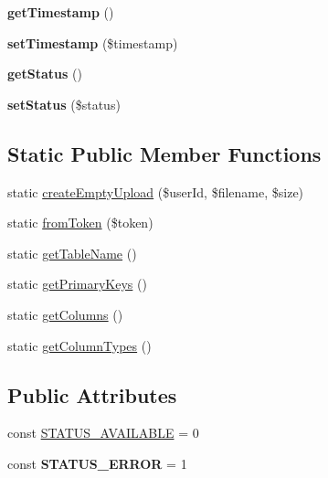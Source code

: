 \begin{DoxyCompactItemize}
\item 
\hypertarget{classUpload_af1374be09f4af36dd1030de3471364f2}{
{\bfseries getTimestamp} ()}
\label{classUpload_af1374be09f4af36dd1030de3471364f2}

\item 
\hypertarget{classUpload_aa428bb0780b59f6ffd0117cd476ba09c}{
{\bfseries setTimestamp} (\$timestamp)}
\label{classUpload_aa428bb0780b59f6ffd0117cd476ba09c}

\item 
\hypertarget{classUpload_aa43980fea79203e3dce98a81d6bb5869}{
{\bfseries getStatus} ()}
\label{classUpload_aa43980fea79203e3dce98a81d6bb5869}

\item 
\hypertarget{classUpload_aa54f646d417aec96d6ef7b7907812429}{
{\bfseries setStatus} (\$status)}
\label{classUpload_aa54f646d417aec96d6ef7b7907812429}

\end{DoxyCompactItemize}
\subsection*{Static Public Member Functions}
\begin{DoxyCompactItemize}
\item 
static \hyperlink{classUpload_a0d3a0940f5ba707968b9f1f132e05387}{createEmptyUpload} (\$userId, \$filename, \$size)
\item 
static \hyperlink{classUpload_a3b66cb1b19e01380f8fa156bd1857b65}{fromToken} (\$token)
\item 
static \hyperlink{classUpload_a9c147629f26a6d0c7b32136eba761869}{getTableName} ()
\item 
static \hyperlink{classUpload_af0e0a173941a75ed21e7d51d86c7d0c4}{getPrimaryKeys} ()
\item 
static \hyperlink{classUpload_ac1fc86fdee048a39c23f706a5df4e4cc}{getColumns} ()
\item 
static \hyperlink{classUpload_a2de5133464c9577aff228f8bb543929e}{getColumnTypes} ()
\end{DoxyCompactItemize}
\subsection*{Public Attributes}
\begin{DoxyCompactItemize}
\item 
const \hyperlink{classUpload_ae16403b6e7561efbc578b84dfd1d97ed}{STATUS\_\-AVAILABLE} = 0
\item 
\hypertarget{classUpload_af097d79ca42f72b8e82e2dbecf92fc1a}{
const {\bfseries STATUS\_\-ERROR} = 1}
\label{classUpload_af097d79ca42f72b8e82e2dbecf92fc1a}

\end{DoxyCompactItemize}
